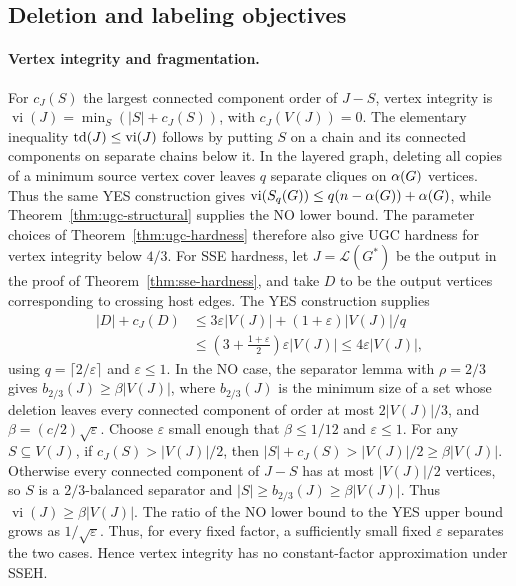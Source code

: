 \subsection{Deletion and labeling objectives}

\paragraph{Vertex integrity and fragmentation.}
For $c_J(S)$ the largest connected component order of $J-S$, vertex integrity is
$\operatorname{vi}(J)=\min_S(|S|+c_J(S))$, with $c_J(V(J))=0$.
The elementary inequality
$\operatorname{td}(J)\leq\operatorname{vi}(J)$ follows by putting $S$ on a chain
and its connected components on separate chains below it. In the layered graph,
deleting all copies of a minimum source vertex cover leaves $q$ separate
cliques on $\alpha(G)$ vertices. Thus the same YES construction gives
$\operatorname{vi}(S_q(G))\leq q(n-\alpha(G))+\alpha(G)$,
while Theorem~\ref{thm:ugc-structural} supplies the NO lower bound.
The parameter choices of Theorem~\ref{thm:ugc-hardness} therefore
also give \textup{UGC} hardness for vertex integrity below $4/3$.
For \textup{SSE} hardness, let $J=\mathcal L(G^*)$ be the output in the
proof of Theorem~\ref{thm:sse-hardness}, and take $D$ to be the output vertices
corresponding to crossing host edges. The YES construction supplies
\[
\begin{aligned}
 |D|+c_J(D)
 &\leq3\varepsilon |V(J)|
   +(1+\varepsilon)|V(J)|/q\\
 &\leq\left(3+\frac{1+\varepsilon}{2}\right)
      \varepsilon |V(J)|
 \leq4\varepsilon |V(J)|,
\end{aligned}
\]
using $q=\lceil2/\varepsilon\rceil$ and $\varepsilon\le1$.
In the NO case, the separator
lemma with $\rho=2/3$ gives $b_{2/3}(J)\geq\beta |V(J)|$, where
$b_{2/3}(J)$ is the minimum size of a set whose deletion leaves every
connected component of order at most $2|V(J)|/3$, and
$\beta=(c/2)\sqrt\varepsilon$. Choose $\varepsilon$ small enough
that $\beta\leq1/12$ and $\varepsilon\leq1$. For any
$S\subseteq V(J)$, if
$c_J(S)>|V(J)|/2$, then $|S|+c_J(S)>|V(J)|/2\geq\beta|V(J)|$.
Otherwise every connected component of $J-S$ has at most $|V(J)|/2$ vertices,
so $S$ is a $2/3$-balanced separator and
$|S|\geq b_{2/3}(J)\geq\beta|V(J)|$. Thus
$\operatorname{vi}(J)\geq\beta|V(J)|$.
The ratio of the NO lower bound to the YES upper bound grows as
$1/\sqrt\varepsilon$. Thus, for every fixed factor, a sufficiently
small fixed $\varepsilon$ separates the two cases. Hence vertex integrity has no constant-factor
approximation under \textup{SSEH}.


